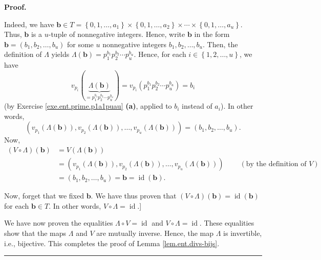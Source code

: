 \documentclass[numbers=enddot,12pt,final,onecolumn,notitlepage]{scrartcl}%
\numberwithin{exer}{subsection}
\theoremstyle{definition}
\newenvironment{fineprint}{\begin{small}}{\end{small}}
\newenvironment{proof}[1][Proof]{\noindent\textbf{#1.} }{\ \rule{0.5em}{0.5em}}
\begin{document}
\begin{proof}
\begin{fineprint}
Indeed, we have $\mathbf{b}\in T=\left\{  0,1,\ldots,a_{1}\right\}
\times\left\{  0,1,\ldots,a_{2}\right\}  \times\cdots\times\left\{
0,1,\ldots,a_{u}\right\}  $. Thus, $\mathbf{b}$ is a $u$-tuple of nonnegative
integers. Hence, write $\mathbf{b}$ in the form $\mathbf{b}=\left(
b_{1},b_{2},\ldots,b_{u}\right)  $ for some $u$ nonnegative integers
$b_{1},b_{2},\ldots,b_{u}$. Then, the definition of $\Lambda$ yields
$\Lambda\left(  \mathbf{b}\right)  =p_{1}^{b_{1}}p_{2}^{b_{2}}\cdots
p_{u}^{b_{u}}$. Hence, for each $i\in\left\{  1,2,\ldots,u\right\}  $, we have%
\[
v_{p_{i}}\left(  \underbrace{\Lambda\left(  \mathbf{b}\right)  }%
_{=p_{1}^{b_{1}}p_{2}^{b_{2}}\cdots p_{u}^{b_{u}}}\right)  =v_{p_{i}}\left(
p_{1}^{b_{1}}p_{2}^{b_{2}}\cdots p_{u}^{b_{u}}\right)  =b_{i}%
\]
(by Exercise \ref{exe.ent.prime.p1a1puau} \textbf{(a)}, applied to $b_{i}$
instead of $a_{i}$). In other words,%
\[
\left(  v_{p_{1}}\left(  \Lambda\left(  \mathbf{b}\right)  \right)  ,v_{p_{2}%
}\left(  \Lambda\left(  \mathbf{b}\right)  \right)  ,\ldots,v_{p_{u}}\left(
\Lambda\left(  \mathbf{b}\right)  \right)  \right)  =\left(  b_{1}%
,b_{2},\ldots,b_{u}\right)  .
\]
Now,%
\begin{align*}
\left(  V\circ\Lambda\right)  \left(  \mathbf{b}\right)   &  =V\left(
\Lambda\left(  \mathbf{b}\right)  \right) \\
&  =\left(  v_{p_{1}}\left(  \Lambda\left(  \mathbf{b}\right)  \right)
,v_{p_{2}}\left(  \Lambda\left(  \mathbf{b}\right)  \right)  ,\ldots,v_{p_{u}%
}\left(  \Lambda\left(  \mathbf{b}\right)  \right)  \right)
\ \ \ \ \ \ \ \ \ \ \left(  \text{by the definition of }V\right) \\
&  =\left(  b_{1},b_{2},\ldots,b_{u}\right)  =\mathbf{b}=\operatorname*{id}%
\left(  \mathbf{b}\right)  .
\end{align*}


Now, forget that we fixed $\mathbf{b}$. We have thus proven that $\left(
V\circ\Lambda\right)  \left(  \mathbf{b}\right)  =\operatorname*{id}\left(
\mathbf{b}\right)  $ for each $\mathbf{b}\in T$. In other words,
$V\circ\Lambda=\operatorname*{id}$.]
\end{fineprint}

We have now proven the equalities $\Lambda\circ V=\operatorname*{id}$ and
$V\circ\Lambda=\operatorname*{id}$. These equalities show that the maps
$\Lambda$ and $V$ are mutually inverse. Hence, the map $\Lambda$ is
invertible, i.e., bijective. This completes the proof of Lemma
\ref{lem.ent.divs-bijs}.
\end{proof}
\end{document}
